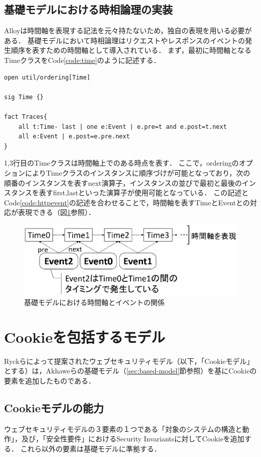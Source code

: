 \documentclass[12pt,a4paper]{jbook}
\begin{document}
\subsection{基礎モデルにおける時相論理の実装}
\label{sec:based-model-temporal-logic}
Alloyは時間軸を表現する記法を元々持たないため，独自の表現を用いる必要がある．
基礎モデルにおいて時相論理はリクエストやレスポンスのイベントの発生順序を表すための時間軸として導入されている．
まず，最初に時間軸となるTimeクラスをCode\ref{code:time}のように記述する．
\begin{lstlisting}[caption=基礎モデルにおける時間軸, label=code:time]
open util/ordering[Time]

sig Time {}

fact Traces{
	all t:Time- last | one e:Event | e.pre=t and e.post=t.next
	all e:Event | e.post=e.pre.next
}
\end{lstlisting}
1,3行目のTimeクラスは時間軸上でのある時点を表す．
ここで，orderingのオプションによりTimeクラスのインスタンスに順序づけが可能となっており，次の順番のインスタンスを表すnext演算子，インスタンスの並びで最初と最後のインスタンスを表すfirst,lastといった演算子が使用可能となっている．
この記述とCode\ref{code:httpevent}の記述を合わせることで，時間軸を表すTimeとEventとの対応が表現できる（図\ref{fig:based-model-temporal-logic}参照）．

\begin{figure}[htb]
\centering
\includegraphics[width=350pt]{./fig/based-model-temporal-logic.eps}
\caption{基礎モデルにおける時間軸とイベントの関係}
\label{fig:based-model-temporal-logic}
\end{figure}

\section{Cookieを包括するモデル}
\label{sec:cookie-model}
Ryckらによって提案されたウェブセキュリティモデル\cite{cookie-model}（以下，「Cookieモデル」とする）は，Akhaweらの基礎モデル（\ref{sec:based-model}節参照）を基にCookieの要素を追加したものである．

\subsection{Cookieモデルの能力}
ウェブセキュリティモデルの３要素の１つである「対象のシステムの構造と動作」，及び，「安全性要件」におけるSecurity Invariantsに対してCookieを追加する．
これら以外の要素は基礎モデルに準拠する．
\end{document}
